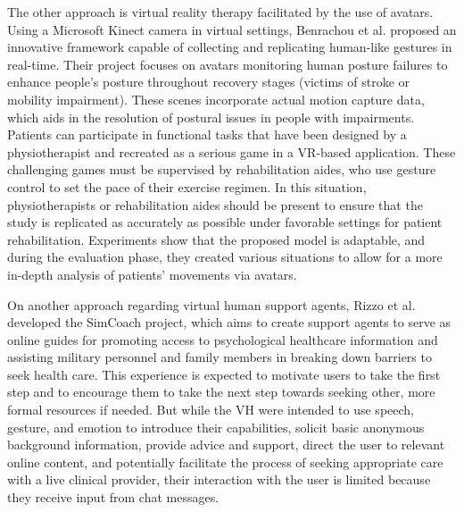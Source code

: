 The other approach is virtual reality therapy facilitated by the use of avatars. Using a Microsoft Kinect camera in virtual settings, Benrachou et al. \cite{BEN20} proposed an innovative framework capable of collecting and replicating human-like gestures in real-time. Their project focuses on avatars monitoring human posture failures to enhance people's posture throughout recovery stages (victims of stroke or mobility impairment). These scenes incorporate actual motion capture data, which aids in the resolution of postural issues in people with impairments. Patients can participate in functional tasks that have been designed by a physiotherapist and recreated as a serious game in a VR-based application. These challenging games must be supervised by rehabilitation aides, who use gesture control to set the pace of their exercise regimen. In this situation, physiotherapists or rehabilitation aides should be present to ensure that the study is replicated as accurately as possible under favorable settings for patient rehabilitation. Experiments show that the proposed model is adaptable, and during the evaluation phase, they created various situations to allow for a more in-depth analysis of patients' movements via avatars.

On another approach regarding virtual human support agents, Rizzo et al. \cite{RIZ11} developed the SimCoach project, which aims to create support agents to serve as online guides for promoting access to psychological healthcare information and assisting military personnel and family members in breaking down barriers to seek health care. This experience is expected to motivate users to take the first step and to encourage them to take the next step towards seeking other, more formal resources if needed. But while the VH were intended to use speech, gesture, and emotion to introduce their capabilities, solicit basic anonymous background information, provide advice and support, direct the user to relevant online content, and potentially facilitate the process of seeking appropriate care with a live clinical provider, their interaction with the user is limited because they receive input from chat messages.

